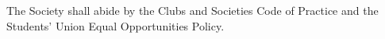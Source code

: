  The Society shall abide by the Clubs and Societies Code of Practice and the Students' Union Equal Opportunities Policy.